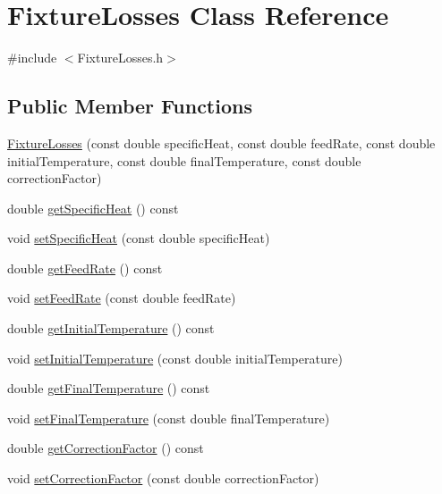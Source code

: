 \hypertarget{class_fixture_losses}{}\section{Fixture\+Losses Class Reference}
\label{class_fixture_losses}


{\ttfamily \#include $<$Fixture\+Losses.\+h$>$}

\subsection*{Public Member Functions}
\begin{DoxyCompactItemize}
\item 
\hyperlink{class_fixture_losses_a97002e16f3f1be19983151cacec02f36}{Fixture\+Losses} (const double specific\+Heat, const double feed\+Rate, const double initial\+Temperature, const double final\+Temperature, const double correction\+Factor)
\item 
double \hyperlink{class_fixture_losses_adb3ea84a757bac31c52784cdd15349ea}{get\+Specific\+Heat} () const
\item 
void \hyperlink{class_fixture_losses_a946e4b6da1cca9f27e57f97688499ee1}{set\+Specific\+Heat} (const double specific\+Heat)
\item 
double \hyperlink{class_fixture_losses_a09707af8de4b304c65f4aeb1130ea44e}{get\+Feed\+Rate} () const
\item 
void \hyperlink{class_fixture_losses_a6543643db6b28f3a78397c97d9c5135f}{set\+Feed\+Rate} (const double feed\+Rate)
\item 
double \hyperlink{class_fixture_losses_aaa2e1042b71482b377e93d675909f78e}{get\+Initial\+Temperature} () const
\item 
void \hyperlink{class_fixture_losses_ad3f2a1013dc5da103f2bcfc1357a449b}{set\+Initial\+Temperature} (const double initial\+Temperature)
\item 
double \hyperlink{class_fixture_losses_a5c4259a78f78c675b063290f0fe6ea36}{get\+Final\+Temperature} () const
\item 
void \hyperlink{class_fixture_losses_a5b65e7118cb96c4f4c88c0d6d1a4f6d3}{set\+Final\+Temperature} (const double final\+Temperature)
\item 
double \hyperlink{class_fixture_losses_af643d715a8b1369efa586fa43e75c732}{get\+Correction\+Factor} () const
\item 
void \hyperlink{class_fixture_losses_a3a3dd839d71adb630e7ce76644f18098}{set\+Correction\+Factor} (const double correction\+Factor)

\end{DoxyCompactItemize}
